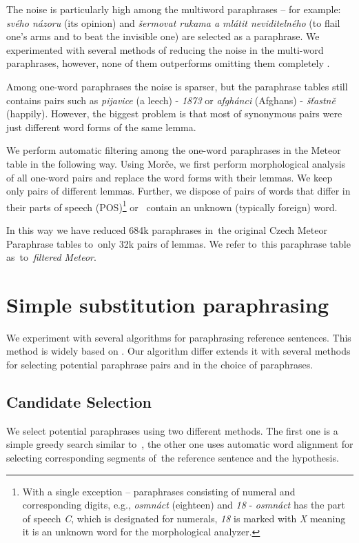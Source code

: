 \documentclass[11pt]{article}
\begin{document}
The noise is particularly high among the multiword paraphrases -- for %
example: \textit{svého názoru} (its opinion) and \textit{šermovat rukama a 
mlátit neviditelného} (to flail one's arms and to beat the invisible one) are 
selected as a paraphrase. We experimented with several methods of reducing
the noise in the multi-word paraphrases, however, none of them outperforms
omitting them completely \cite{barancikova:2014}.
 
Among one-word paraphrases the noise is sparser, but the paraphrase tables  %
still contains pairs such as \textit{pijavice} (a leech) - \textit{1873}
or \textit{afgh\'{a}nci} (Afghans) - \textit{š\v{t}astně} (happily). 
However, the biggest problem is that most of synonymous pairs were just 
different word forms of the same lemma. 

We perform automatic filtering among the one-word paraphrases in the 
Meteor table in the following way. Using Morče, we first perform morphological  %
analysis of all one-word pairs and replace the word forms with their lemmas. We 
keep only pairs of different lemmas. Further, we dispose of pairs of words that 
differ in their parts of speech (POS)\footnote{With a single exception -- 
paraphrases consisting of numeral and corresponding digits, e.g., 
\textit{osmnáct} (eighteen) and \textit{18} - \textit{osmnáct} has the part of 
speech \textit{C}, which is designated for numerals, \textit{18} is marked with 
\textit{X} meaning it is an unknown word for the morphological analyzer.} or
~contain an unknown (typically foreign) word.

In this way we have reduced 684k paraphrases in~the original Czech Meteor 
Paraphrase tables to~only 32k pairs of lemmas. We refer to~this paraphrase
table as~to~\textit{filtered Meteor}.

\section{Simple substitution paraphrasing}
\label{lrec}
We experiment with several algorithms for paraphrasing reference sentences. 
This method is widely based on . Our algorithm differ extends it 
with several methods for selecting potential paraphrase pairs and in the choice 
of paraphrases.

\subsection{Candidate Selection}
We select potential paraphrases using two different methods. The first one is a 
simple greedy search similar to~, the other one uses automatic 
word alignment for selecting corresponding segments of~the reference sentence 
and the hypothesis.
\end{document}
